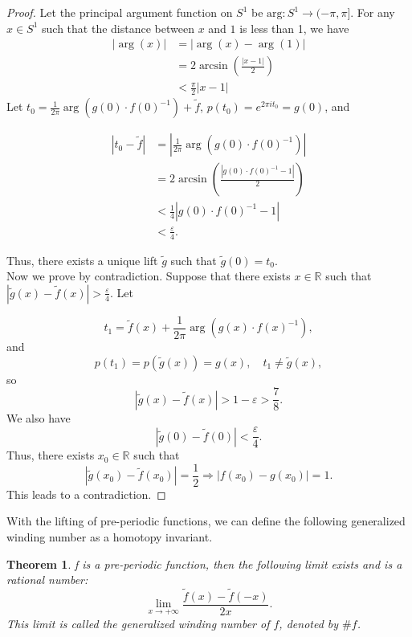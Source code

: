 \documentclass[11pt]{article}
\newtheorem{theorem}{Theorem}[section]  %
\theoremstyle{remark}
\begin{document}
\begin{proof}
    Let the principal argument function on \( S^1 \) be \( \text{arg}: S^1 \to (-\pi, \pi] \). For any \(x\in S^1\) such that the distance between $x$ and $1$ is less than 1, we have
\begin{align*}
\left| \arg(x) \right| &= \left| \arg(x) - \arg(1) \right| \\
&= 2 \arcsin\left( \frac{|x - 1|}{2} \right) \\
&< \frac{\pi}{2} |x - 1|
\end{align*}
Let $t_0=\frac{1}{2\pi} \arg \left(g(0) \cdot f(0)^{-1} \right)+\tilde{f}$, $p(t_0)=e^{2\pi i t_0}=g(0)$, and

\begin{align*}
\left| t_0-\tilde{f} \right| &= \left| \frac{1}{2\pi} \arg \left(g(0) \cdot f(0)^{-1} \right) \right| \\
&= 2 \arcsin\left( \frac{|g(0) \cdot f(0)^{-1} - 1|}{2} \right) \\
&< \frac{1}{4} |g(0) \cdot f(0)^{-1} - 1|\\
&< \frac{\varepsilon}{4}.
\end{align*}

Thus, there exists a unique lift \( \tilde{g} \) such that \( \tilde{g}(0) = t_0 \).\\
Now we prove by contradiction. Suppose that there exists $x \in \mathbb{R}$ such that $|\tilde{g}(x) - \tilde{f}(x)| > \frac{\varepsilon}{4}$. Let

$$
t_1 = \tilde{f}(x) + \frac{1}{2\pi} \arg (g(x) \cdot f(x)^{-1}),
$$
and
$$
p(t_1) = p(\tilde{g}(x))=g(x), \quad t_1 \neq \tilde{g}(x),
$$
so
$$
|\tilde{g}(x) - \tilde{f}(x)| > 1 - \varepsilon > \frac{7}{8}.
$$
We also have
$$
|\tilde{g}(0) - \tilde{f}(0)|<\frac{\varepsilon}{4}.
$$
Thus, there exists $x_0 \in \mathbb{R}$ such that
$$
|\tilde{g}(x_0) - \tilde{f}(x_0)|=\frac{1}{2}\Rightarrow |f(x_0)-g(x_0)|=1.
$$
This leads to a contradiction.
\end{proof}
With the lifting of pre-periodic functions, we can define the following generalized winding number as a homotopy invariant. 
\begin{theorem}\label{gwd}
f is a pre-periodic function, then the following limit exists and is a rational number:
$$
\lim_{x\to+\infty}\frac{\tilde{f}(x)-\tilde{f}(-x)}{2x}.
$$
This limit is called the generalized winding number of \(f\), denoted by \(\#f\).
\end{theorem}
\end{document}
